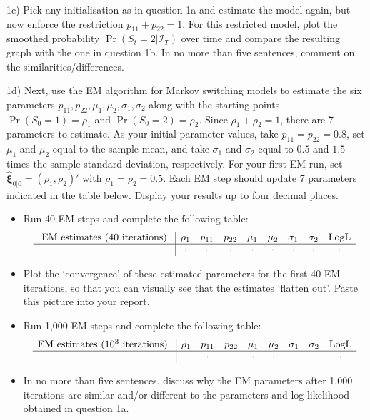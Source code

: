\documentclass[12pt, a4paper]{article}
\newcommand{\Xxi}{\boldsymbol{\xi}}
\begin{document}
\medskip\noindent 1c) Pick any initialisation as in question 1a and estimate the model again, but now enforce the restriction $p_{11}+p_{22}=1$. For this restricted model, plot the smoothed probability $\Pr(S_t=2|\mathcal{I}_T)$ over time and compare the resulting graph with the one in question 1b. In no more than five sentences, comment on the similarities/differences. 

\medskip\noindent 1d) Next, use the EM algorithm for Markov switching models to estimate the six parameters $p_{11},p_{22},\mu_1,\mu_2,\sigma_1,\sigma_2$ along with the starting points $\Pr(S_0=1)=\rho_1$ and $\Pr(S_0=2)=\rho_2$.  Since $\rho_1+\rho_2=1$, there are 7 parameters to estimate. As your initial parameter values, take $p_{11}=p_{22}=0.8$, set $\mu_1$ and $\mu_2$ equal to the sample mean, and take $\sigma_1$ and $\sigma_2$ equal to $0.5$ and $1.5$ times the sample standard deviation, respectively. For your first EM run, set $\hat{\Xxi}_{0|0}=(\rho_1,\rho_2)'$ with $\rho_1=\rho_2=0.5$. Each EM step should update 7 parameters indicated in the table below. Display your results up to four decimal places.

\begin{itemize}
\item
Run 40 EM steps and complete the following table:
\[
\begin{array}{r@{\hspace{3mm}}|cccccccc}
   \mbox{ EM estimates ($40$ iterations)}                   & \rho_1 & p_{11} & p_{22} & \mu_1 & \mu_2 &\sigma_1 & \sigma_2 & \mbox{LogL}\\ 
   \hline
\mbox{} & \cdot & \cdot & \cdot  & \cdot  & \cdot  & \cdot & \cdot &\cdot  
\end{array}
\]

\item Plot the `convergence' of these estimated parameters for the first 40 EM iterations, so that you can visually see that the estimates `flatten out'. Paste this picture into your report.
\item
Run 1,000 EM steps and complete the following table:
\[
\begin{array}{r@{\hspace{3mm}}|cccccccc}
   \mbox{EM estimates ($10^3$ iterations)}                   & \rho_1 & p_{11} & p_{22} & \mu_1 & \mu_2 &\sigma_1 & \sigma_2 & \mbox{LogL}\\ 
   \hline
\mbox{} & \cdot & \cdot & \cdot  & \cdot  & \cdot  & \cdot & \cdot  & \cdot \\
\end{array}
\]

\item In no more than five sentences, discuss why the EM parameters after 1,000 iterations are similar and/or different to the parameters and log likelihood obtained in question 1a.
\end{itemize}
\end{document}
